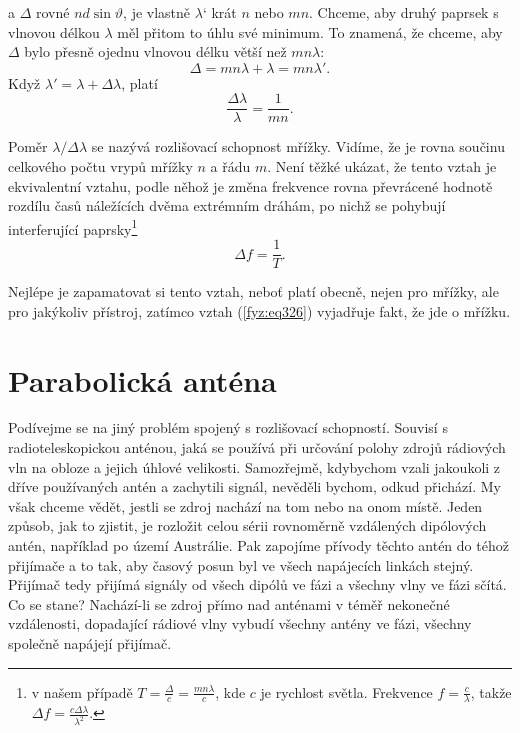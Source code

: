 {    a \(\Delta\) rovné \(nd\sin\vartheta\), je vlastně \(\lambda‘\) krát \(n\) nebo \(mn\). Chceme, 
    aby druhý paprsek s vlnovou délkou \(\lambda\) měl přitom to úhlu své minimum. To znamená, že 
    chceme, aby \(\Delta\) bylo přesně ojednu vlnovou délku větší než \(mn\lambda\):
    \begin{equation*}
      \Delta = mn\lambda + \lambda = mn\lambda'.
    \end{equation*}
    Když \(\lambda' = \lambda + \Delta\lambda\), platí
    \begin{equation}\label{fyz:eq326}
      \frac{\Delta\lambda}{\lambda} = \frac{1}{mn}.
    \end{equation}
    
    Poměr \(\lambda/\Delta\lambda\) se nazývá rozlišovací schopnost mřížky. Vidíme, že je rovna 
    součinu celkového počtu vrypů mřížky \(n\) a řádu \(m\). Není těžké ukázat, že tento vztah je 
    ekvivalentní vztahu, podle něhož je změna frekvence rovna převrácené hodnotě rozdílu časů 
    náležících dvěma extrémním dráhám, po nichž se pohybují interferující paprsky\footnote{v našem 
    případě \(T=\frac{\Delta}{c} = \frac{mn\lambda}{c}\), kde \(c\) je rychlost světla. Frekvence 
    \(f = \frac{c}{\lambda}\), takže \(\Delta f = \frac{c\Delta\lambda}{\lambda^2}\).}
    \begin{equation*}
      \Delta f =\frac{1}{T}.
    \end{equation*}
    
    Nejlépe je zapamatovat si tento vztah, neboť platí obecně, nejen pro mřížky, ale pro jakýkoliv 
    přístroj, zatímco vztah (\ref{fyz:eq326}) vyjadřuje fakt, že jde o mřížku.
    
  \section{Parabolická anténa}\label{fyz:IchapXXXsecIV}
    Podívejme se na jiný problém spojený s rozlišovací schopností. Souvisí s radioteleskopickou 
    anténou, jaká se používá při určování polohy zdrojů rádiových vln na obloze a jejich úhlové 
    velikosti. Samozřejmě, kdybychom vzali jakoukoli z dříve používaných antén a zachytili signál, 
    nevěděli bychom, odkud přichází. My však chceme vědět, jestli se zdroj nachází na tom nebo na 
    onom místě. Jeden způsob, jak to zjistit, je rozložit celou sérii rovnoměrně vzdálených 
    dipólových antén, například po území Austrálie. Pak zapojíme přívody těchto antén do téhož 
    přijímače a to tak, aby časový posun byl ve všech napájecích linkách stejný. Přijímač tedy 
    přijímá signály od všech dipólů ve fázi a všechny vlny ve fázi sčítá. Co se stane? Nachází-li 
    se zdroj přímo nad anténami v téměř nekonečné vzdálenosti, dopadající rádiové vlny vybudí 
    všechny antény ve fázi, všechny společně napájejí přijímač. 
    
}
